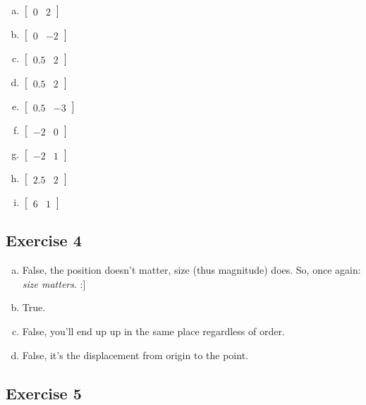\documentclass[11pt]{article}
\begin{document}
\begin{enumerate}[a.]
	\item %
$
\begin{bmatrix}
0 & 2
\end{bmatrix}
$
	\item %
$
\begin{bmatrix}
0 & -2
\end{bmatrix}
$
	\item %
$
\begin{bmatrix}
0.5 & 2
\end{bmatrix}
$
	\item %
$
\begin{bmatrix}
0.5 & 2
\end{bmatrix}
$
	\item %
$
\begin{bmatrix}
0.5 & -3
\end{bmatrix}
$
	\item %
$
\begin{bmatrix}
-2 & 0
\end{bmatrix}
$
	\item %
$
\begin{bmatrix}
-2 & 1
\end{bmatrix}
$
	\item %
$
\begin{bmatrix}
2.5 & 2
\end{bmatrix}
$
	\item %
$
\begin{bmatrix}
6 & 1
\end{bmatrix}
$
\end{enumerate}

\subsection{Exercise 4}

\begin{enumerate}[a.]
	\item False, the position doesn't matter, size (thus magnitude) does. So, once again: \textit{size matters}. :]
	\item True.
	\item False, you'll end up up in the same place regardless of order.
	\item False, it's the displacement from origin to the point.
\end{enumerate}

\subsection{Exercise 5}
\end{document}
